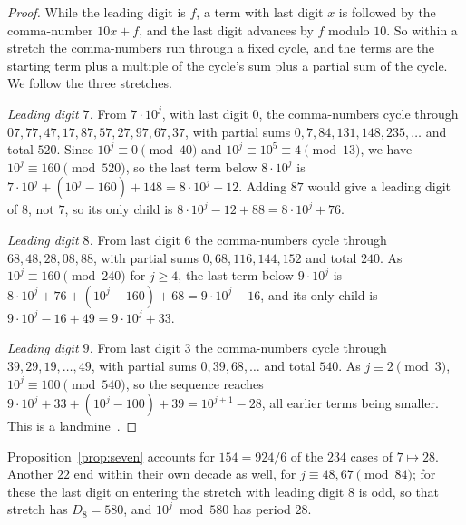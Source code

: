\begin{proof}
  While the leading digit is $f$, a term with last digit $x$ is followed by the comma-number
  $10x + f$, and the last digit advances by $f$ modulo $10$. So within a stretch the comma-numbers
  run through a fixed cycle, and the terms are the starting term plus a multiple of the cycle's sum
  plus a partial sum of the cycle. We follow the three stretches.

  \emph{Leading digit $7$.} From $7 \cdot 10^j$, with last digit $0$, the comma-numbers cycle through
  $07, 77, 47, 17, 87, 57, 27, 97, 67, 37$, with partial sums $0, 7, 84, 131, 148, 235, \dots$ and
  total $520$. Since $10^j \equiv 0 \pmod{40}$ and $10^j \equiv 10^5 \equiv 4 \pmod{13}$, we have
  $10^j \equiv 160 \pmod{520}$, so the last term below $8 \cdot 10^j$ is
  $7 \cdot 10^j + (10^j - 160) + 148 = 8 \cdot 10^j - 12$. Adding $87$ would give a leading digit
  of $8$, not $7$, so its only child is $8 \cdot 10^j - 12 + 88 = 8 \cdot 10^j + 76$.

  \emph{Leading digit $8$.} From last digit $6$ the comma-numbers cycle through $68, 48, 28, 08, 88$,
  with partial sums $0, 68, 116, 144, 152$ and total $240$. As $10^j \equiv 160 \pmod{240}$ for
  $j \ge 4$, the last term below $9 \cdot 10^j$ is
  $8 \cdot 10^j + 76 + (10^j - 160) + 68 = 9 \cdot 10^j - 16$, and its only child is
  $9 \cdot 10^j - 16 + 49 = 9 \cdot 10^j + 33$.

  \emph{Leading digit $9$.} From last digit $3$ the comma-numbers cycle through
  $39, 29, 19, \dots, 49$, with partial sums $0, 39, 68, \dots$ and total $540$. As
  $j \equiv 2 \pmod 3$, $10^j \equiv 100 \pmod{540}$, so the sequence reaches
  $9 \cdot 10^j + 33 + (10^j - 100) + 39 = 10^{j+1} - 28$, all earlier terms being smaller. This is a
  landmine~\cite[Theorem~5.1]{comma}.
\end{proof}

Proposition~\ref{prop:seven} accounts for $154 = 924 / 6$ of the $234$ cases of $7 \mapsto 28$.
Another $22$ end within their own decade as well, for $j \equiv 48, 67 \pmod{84}$; for these the
last digit on entering the stretch with leading digit $8$ is odd, so that stretch has $D_8 = 580$,
and $10^j \bmod 580$ has period $28$.

